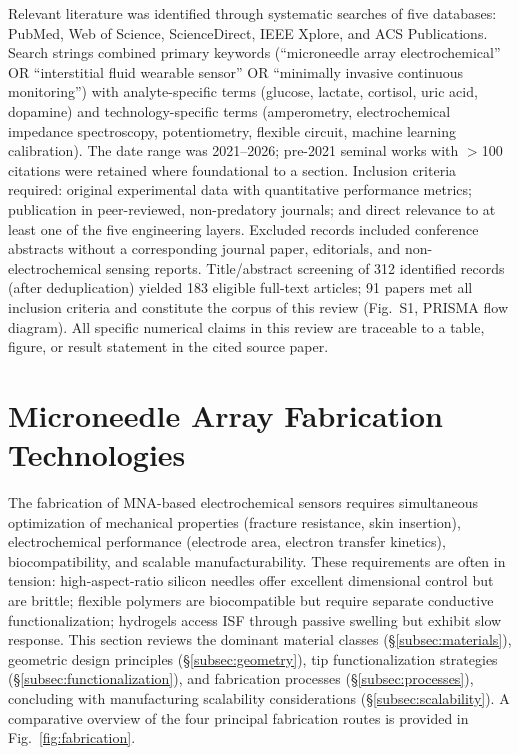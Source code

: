 \documentclass[review,1p]{elsarticle}
\begin{document}
Relevant literature was identified through systematic searches of five databases: PubMed, Web of Science, ScienceDirect, IEEE Xplore, and ACS Publications. Search strings combined primary keywords (``microneedle array electrochemical'' OR ``interstitial fluid wearable sensor'' OR ``minimally invasive continuous monitoring'') with analyte-specific terms (glucose, lactate, cortisol, uric acid, dopamine) and technology-specific terms (amperometry, electrochemical impedance spectroscopy, potentiometry, flexible circuit, machine learning calibration). The date range was 2021--2026; pre-2021 seminal works with $>$100 citations were retained where foundational to a section. Inclusion criteria required: original experimental data with quantitative performance metrics; publication in peer-reviewed, non-predatory journals; and direct relevance to at least one of the five engineering layers. Excluded records included conference abstracts without a corresponding journal paper, editorials, and non-electrochemical sensing reports. Title/abstract screening of 312 identified records (after deduplication) yielded 183 eligible full-text articles; 91 papers met all inclusion criteria and constitute the corpus of this review (Fig.~S1, PRISMA flow diagram). All specific numerical claims in this review are traceable to a table, figure, or result statement in the cited source paper.


\section{Microneedle Array Fabrication Technologies}
\label{sec:fabrication}

The fabrication of MNA-based electrochemical sensors requires simultaneous optimization of mechanical properties (fracture resistance, skin insertion), electrochemical performance (electrode area, electron transfer kinetics), biocompatibility, and scalable manufacturability. These requirements are often in tension: high-aspect-ratio silicon needles offer excellent dimensional control but are brittle; flexible polymers are biocompatible but require separate conductive functionalization; hydrogels access ISF through passive swelling but exhibit slow response. This section reviews the dominant material classes (\S\ref{subsec:materials}), geometric design principles (\S\ref{subsec:geometry}), tip functionalization strategies (\S\ref{subsec:functionalization}), and fabrication processes (\S\ref{subsec:processes}), concluding with manufacturing scalability considerations (\S\ref{subsec:scalability}). A comparative overview of the four principal fabrication routes is provided in Fig.~\ref{fig:fabrication}.
\end{document}
